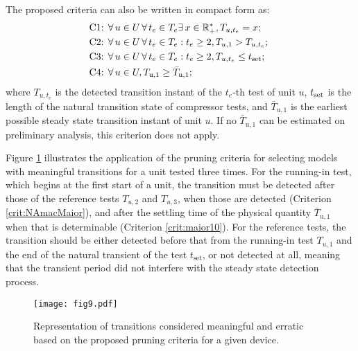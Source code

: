 \documentclass[preprint,11pt,number]{elsarticle}
\begin{document}
The proposed criteria can also be written in compact form as:
\begin{equation}
    \begin{gathered}
        \hfilneg \text{C1: } \forall\, u \in U\, \forall\, t_e \in T_e \exists \, x \in \mathbb{R}_+^*, T_{u,t_e} = x;\\
        \hfilneg \text{C2: } \forall\, u \in U \,\forall\, t_e \in T_e: t_e \geq 2, T_{u,1}>T_{u,t_e}; \
        \\\hfilneg \text{C3: } \forall\, u \in U \,\forall\, t_e \in T_e: t_e \geq 2, T_{u,t_e}\leq t_{\rm set}; 
        \\\hfilneg \text{C4: } \forall\, u \in U, T_{\text{u},1}\geq \bar{T}_{\text{u},1};
    \end{gathered}
\end{equation}
%
\noindent where $T_{u,t_e}$ is the detected transition instant of the $t_e$-th test of unit $u$, $t_{\rm set}$ is the length of the natural transition state of compressor tests, and $\bar{T}_{\text{u},1}$ is the earliest possible steady state transition instant of unit $u$. If no $\bar{T}_{\text{u},1}$ can be estimated on preliminary analysis, this criterion does not apply.

Figure \ref{fig:pruningCriteria} illustrates the application of the pruning criteria for selecting models with meaningful transitions for a unit tested three times. For the running-in test, which begins at the first start of a unit, the transition must be detected after those of the reference tests $T_{u,2}$ and $T_{u,3}$, when those are detected (Criterion \ref{crit:NAmacMaior}), and after the settling time of the physical quantity $\bar{T}_{\text{u},1}$ when that is determinable (Criterion \ref{crit:maior10}). For the reference tests, the transition should be either detected before that from the running-in test $T_{u,1}$ and the end of the natural transient of the test $t_{\text{set}}$, or not detected at all, meaning that the transient period did not interfere with the steady state detection process.

\begin{figure}[htb]
\begin{center}
\texttt{[image: fig9.pdf]}    %
\caption{Representation of transitions considered meaningful and erratic based on the proposed pruning criteria for a given device.}
\label{fig:pruningCriteria}
\end{center}
\end{figure}
\end{document}
